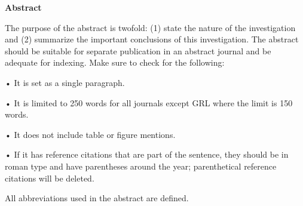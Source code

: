 \textbf{Abstract}

The purpose of the abstract is twofold: (1) state the nature of the investigation and (2) summarize the important conclusions of this investigation. The abstract should be suitable for separate publication in an abstract journal and be adequate for indexing. Make sure to check for the following:

•	It is set as a single paragraph.

•	It is limited to 250 words for all journals except GRL where the limit is 150 words.

•	It does not include table or figure mentions.

•	If it has reference citations that are part of the sentence, they should be in roman type and have parentheses around the year; parenthetical reference citations will be deleted.

All abbreviations used in the abstract are defined.
  
  